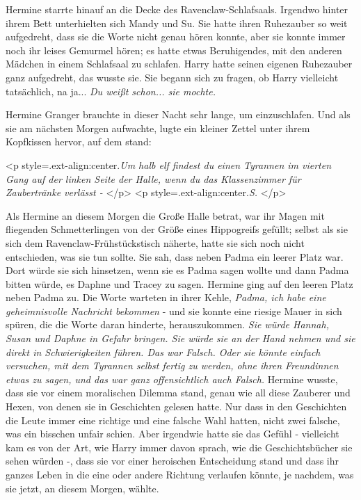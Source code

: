 Hermine starrte hinauf an die Decke des Ravenclaw-Schlafsaals. Irgendwo hinter
ihrem Bett unterhielten sich Mandy und Su. Sie hatte ihren Ruhezauber so weit
aufgedreht, dass sie die Worte nicht genau hören konnte, aber sie konnte immer
noch ihr leises Gemurmel hören; es hatte etwas Beruhigendes, mit den anderen
Mädchen in einem Schlafsaal zu schlafen. Harry hatte seinen eigenen Ruhezauber
ganz aufgedreht, das wusste sie. Sie begann sich zu fragen, ob Harry vielleicht
tatsächlich, na ja... \emph{Du weißt schon... sie mochte.}

Hermine Granger brauchte in dieser Nacht sehr lange, um einzuschlafen. Und als
sie am nächsten Morgen aufwachte, lugte ein kleiner Zettel unter ihrem
Kopfkissen hervor, auf dem stand:

<p style=\grqq{}.ext-align:center\grqq{}.\emph{\glqq Um halb elf findest du
einen Tyrannen im vierten Gang auf der linken Seite der Halle, wenn du das
Klassenzimmer für Zaubertränke verlässt - }</p> <p
style=\grqq{}.ext-align:center\grqq{}.\emph{S.\grqq{} }</p>

Als Hermine an diesem Morgen die Große Halle betrat, war ihr Magen mit
fliegenden Schmetterlingen von der Größe eines Hippogreifs gefüllt; selbst als
sie sich dem Ravenclaw-Frühstückstisch näherte, hatte sie sich noch nicht
entschieden, was sie tun sollte. Sie sah, dass neben Padma ein leerer Platz war.
Dort würde sie sich hinsetzen, wenn sie es Padma sagen wollte und dann Padma
bitten würde, es Daphne und Tracey zu sagen. Hermine ging auf den leeren Platz
neben Padma zu. Die Worte warteten in ihrer Kehle, \emph{Padma, ich habe eine
geheimnisvolle Nachricht bekommen} - und sie konnte eine riesige Mauer in sich
spüren, die die Worte daran hinderte, herauszukommen. \emph{Sie würde Hannah,
Susan und Daphne in Gefahr bringen. Sie würde sie an der Hand nehmen und sie
direkt in Schwierigkeiten führen. Das war Falsch. Oder sie könnte einfach
versuchen, mit dem Tyrannen selbst fertig zu werden, ohne ihren Freundinnen
etwas zu sagen, und das war ganz offensichtlich auch Falsch.} Hermine wusste,
dass sie vor einem moralischen Dilemma stand, genau wie all diese Zauberer und
Hexen, von denen sie in Geschichten gelesen hatte. Nur dass in den Geschichten
die Leute immer eine richtige und eine falsche Wahl hatten, nicht zwei falsche,
was ein bisschen unfair schien. Aber irgendwie hatte sie das Gefühl - vielleicht
kam es von der Art, wie Harry immer davon sprach, wie die Geschichtsbücher sie
sehen würden -, dass sie vor einer heroischen Entscheidung stand und dass ihr
ganzes Leben in die eine oder andere Richtung verlaufen könnte, je nachdem, was
sie jetzt, an diesem Morgen, wählte.

